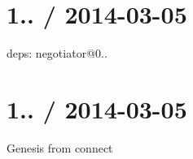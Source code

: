 \section*{1.. / 2014-\/03-\/05 }


\begin{DoxyItemize}
\item deps\+: negotiator@0..
\end{DoxyItemize}

\section*{1.. / 2014-\/03-\/05 }


\begin{DoxyItemize}
\item Genesis from connect 
\end{DoxyItemize}